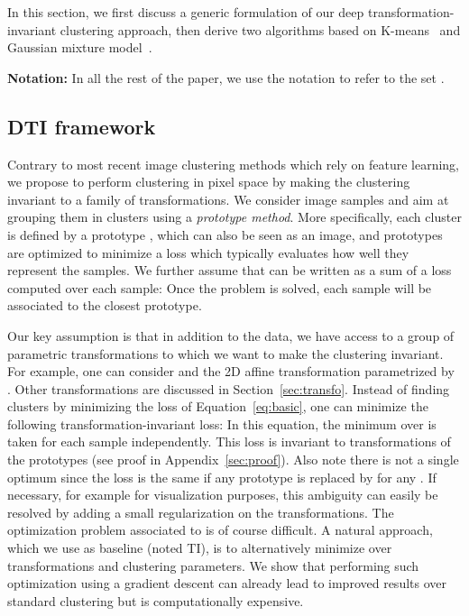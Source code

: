 \documentclass{article}
\begin{document}
In this section, we first discuss a generic formulation of our deep transformation-invariant 
clustering approach, then derive two algorithms based on 
K-means~\cite{macqueenMethodsClassificationAnalysis1967} and Gaussian mixture 
model~\cite{dempsterMaximumLikelihoodIncomplete1977}.

\vspace{-0.3em}
{\bf Notation:} In all the rest of the paper, we use the notation  to refer to the 
set .

\subsection{DTI framework}\label{sec:dti}

Contrary to most recent image clustering methods which rely on feature learning, we propose 
to perform clustering in pixel space by making the clustering invariant to a family of 
transformations. We consider  image samples  and aim at grouping them in  
clusters using a \textit{prototype method}. More specifically, each cluster  is defined by 
a prototype , which can also be seen as an image, and prototypes are optimized to 
minimize a loss  which typically evaluates how well they represent the samples.  
We further assume that  can be written as a sum of a loss  computed over each 
sample:
Once the problem is solved, each sample  will be associated to the closest prototype.

Our key assumption is that in addition to the data, we have access to a group of parametric
transformations  to which we want to make the clustering 
invariant. For example, one can consider  and  the 2D 
affine transformation parametrized by . Other transformations are discussed in 
Section~\ref{sec:transfo}. Instead of finding clusters by minimizing the loss of 
Equation~\ref{eq:basic}, one can minimize the following transformation-invariant loss:
In this equation, the minimum over  is taken for each sample independently. This 
loss is invariant to transformations of the prototypes (see proof in 
Appendix~\ref{sec:proof}).  Also note there is not a single optimum since the loss is the 
same if any prototype  is replaced by  for any . If 
necessary, for example for visualization purposes, this ambiguity can easily be resolved by 
adding a small regularization on the transformations. The optimization problem associated to 
 is of course difficult.
A natural approach, which we use as baseline (noted TI), is to alternatively minimize over 
transformations and clustering parameters. We show that performing such optimization using a 
gradient descent can already lead to improved results over standard clustering but is 
computationally expensive. 
\end{document}
